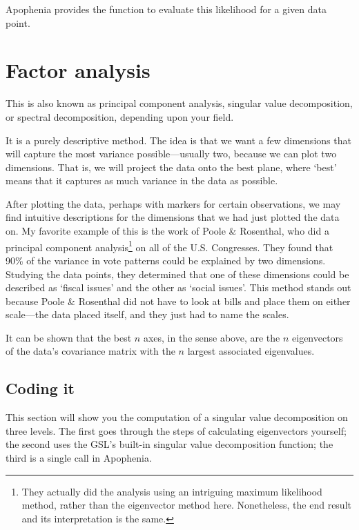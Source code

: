 
Apophenia provides the function  to evaluate this likelihood for a given data point.



\section{Factor analysis} \label{pca} 
This is also known as principal component
analysis, singular value decomposition, or spectral decomposition, depending upon your field. 

It is a purely descriptive method.  The idea is that we want a few
dimensions that will capture the most variance possible---usually two,
because we can plot two dimensions. That is, we will project the data
onto the best plane, where `best' means that it captures as much
variance in the data as possible.

After plotting the data, perhaps with markers for certain observations,
we may find intuitive descriptions for the dimensions that we had just plotted the
data on. My favorite example of this is the work of Poole \& Rosenthal,
who did a principal component analysis\footnote{They actually did
the analysis using an intriguing maximum likelihood method, rather
than the eigenvector method here. Nonetheless, the end result and its
interpretation is the same.} on all of the U.S. Congresses. They found
that 90\% of the variance in vote patterns could be explained by two dimensions.
Studying the data points, they determined that one of these dimensions could be
described as `fiscal issues' and the other as `social issues'. This method stands
out because Poole \& Rosenthal did not have to look at bills and place them on
either scale---the data placed itself, and they just had to name the scales.


It can be shown that the best $n$ axes, in the sense above, are the
$n$ eigenvectors of the data's covariance matrix with the $n$ largest
associated eigenvalues.

\subsection{Coding it}
This section will show you the computation of a singular value
decomposition on three levels. The first goes through the steps of
calculating eigenvectors yourself; the second uses the 
GSL's built-in singular value decomposition function; the third is a
single call in Apophenia.

